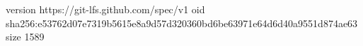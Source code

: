 version https://git-lfs.github.com/spec/v1
oid sha256:e53762d07e7319b5615e8a9d57d320360bd6be63971e64d6d40a9551d874ae63
size 1589
